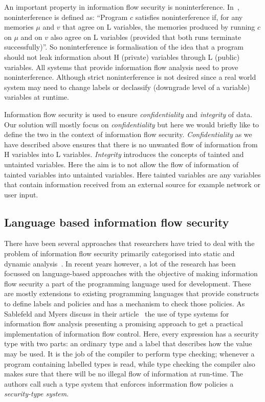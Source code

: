 An important property in information flow security is noninterference. In~\cite{PrincInfoSec},
noninterference is defined as: ``Program $c$ satisfies noninterference if, for
any memories $\mu$ and $v$ that agree on L variables, the memories produced by
running $c$ on $\mu$ and on $v$ also agree on L variables (provided that both runs
terminate successfully)''. So noninterference is formalisation of the idea that a
program should not leak information about H (private) variables through L (public)
variables. All systems that provide information flow analysis need to prove
noninterference. Although strict noninterference is not desired since a real world
system may need to change labels or declassify (downgrade level of a variable)
variables at runtime.

Information flow security is used to ensure \textit{confidentiality} and \textit{integrity}
of data. Our solution will mostly focus on \textit{confidentiality} but here we would
briefly like to define the two in the context of information flow security. \textit{Confidentiality}
as we have described above ensures that there is no unwanted flow of information
from H variables into L variables. \textit{Integrity} introduces the concepts of
tainted and untainted variables. Here the aim is to not allow the flow of information
of tainted variables into untainted variables. Here tainted variables are any
variables that contain information received from an external source for example
network or user input.

\subsection{Language based information flow security \label{subsec:langinfo}}
There have been several approaches that researchers have tried to deal with the
problem of information flow security primarily categorised into static and dynamic
analysis~\cite{Russo, Chlipala}. In recent years however, a lot of the research has
been focussed on language-based approaches with the objective of making information
flow security a part of the programming language used for development. These are
mostly extensions to existing programming languages that provide constructs to define
labels and policies and has a mechanism to check those policies. As Sablefeld and
Myers discuss in their article~\cite{LangInfo} the use of type systems for information
flow analysis presenting a promising approach to get a practical implementation of
information flow control. Here, every expression has a security type with two parts:
an ordinary type and a label that describes how the value may be used. It is the
job of the compiler to perform type checking; whenever a program containing labelled
types is read, while type checking the compiler also makes sure that there will
be no illegal flow of information at run-time. The authors call such a type system
that enforces inforrmation flow policies a \textit{security-type system}.

